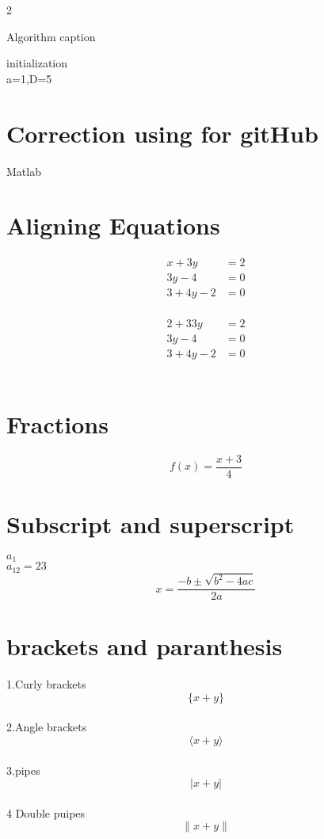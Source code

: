 \documentclass[12pt]{book}
\begin{document}
\begin {multicols}{2}
\begin{algorithm}[H]
\SetAlgoLined %
\caption{Algorithm caption}
initialization\\
a=1,D=5 \;

\end{algorithm}

\section{Correction using for gitHub}
\begin{algorithm}[H]
\caption{Matlab}
\end{algorithm}
\section {Aligning Equations}
\begin{align}
 x+3y &=2 \nonumber\\
 3y-4&=0 \\
 3+4y-2&=0
\end{align}\\
\begin{align*}
 2+33y &=2 \\
 3y-4&=0 \\
 3+4y-2&=0
\end{align*}\\
\section{Fractions}
$$ f(x) = \frac{x+3}{4}$$
\section {Subscript and superscript}
$ a_1 $ \\
$a_{12} =23$ \\
\begin{equation}
x=\frac{-b \pm \sqrt{b^2-4ac}}{2a} 
\end{equation}
\section{brackets and paranthesis}
1.Curly brackets $$ \{ x+y \}  $$\\
2.Angle brackets $$ \langle x+y \rangle $$\\
3.pipes $$ |x+y| $$ \\
4 Double puipes $$ \|  x+y \| $$ \\


\end{multicols}
\end{document}
